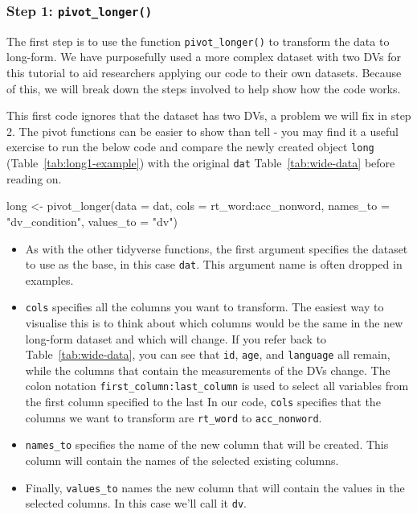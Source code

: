 \documentclass[
  english,
  doc,floatsintext]{apa6}
\newenvironment{Shaded}{\begin{snugshade}}{\end{snugshade}}
\newcommand{\AttributeTok}[1]{\textcolor[rgb]{0.77,0.63,0.00}{#1}}
\newcommand{\FunctionTok}[1]{\textcolor[rgb]{0.00,0.00,0.00}{#1}}
\newcommand{\NormalTok}[1]{#1}
\newcommand{\OtherTok}[1]{\textcolor[rgb]{0.56,0.35,0.01}{#1}}
\newcommand{\SpecialCharTok}[1]{\textcolor[rgb]{0.00,0.00,0.00}{#1}}
\newcommand{\StringTok}[1]{\textcolor[rgb]{0.31,0.60,0.02}{#1}}
\begin{document}
\hypertarget{step-1-pivot_longer}{%
\subsubsection{\texorpdfstring{Step 1: \texttt{pivot\_longer()}}{Step 1: pivot\_longer()}}\label{step-1-pivot_longer}}

The first step is to use the function \texttt{pivot\_longer()} to transform the data to long-form. We have purposefully used a more complex dataset with two DVs for this tutorial to aid researchers applying our code to their own datasets. Because of this, we will break down the steps involved to help show how the code works.

This first code ignores that the dataset has two DVs, a problem we will fix in step 2. The pivot functions can be easier to show than tell - you may find it a useful exercise to run the below code and compare the newly created object \texttt{long} (Table~\ref{tab:long1-example}) with the original \texttt{dat} Table~\ref{tab:wide-data} before reading on.

\begin{Shaded}
\begin{Highlighting}[]
\NormalTok{long }\OtherTok{\textless{}{-}} \FunctionTok{pivot\_longer}\NormalTok{(}\AttributeTok{data =}\NormalTok{ dat, }
                     \AttributeTok{cols =}\NormalTok{ rt\_word}\SpecialCharTok{:}\NormalTok{acc\_nonword, }
                     \AttributeTok{names\_to =} \StringTok{"dv\_condition"}\NormalTok{,}
                     \AttributeTok{values\_to =} \StringTok{"dv"}\NormalTok{)}
\end{Highlighting}
\end{Shaded}

\begin{itemize}
\item
  As with the other tidyverse functions, the first argument specifies the dataset to use as the base, in this case \texttt{dat}. This argument name is often dropped in examples.
\item
  \texttt{cols} specifies all the columns you want to transform. The easiest way to visualise this is to think about which columns would be the same in the new long-form dataset and which will change. If you refer back to Table~\ref{tab:wide-data}, you can see that \texttt{id}, \texttt{age}, and \texttt{language} all remain, while the columns that contain the measurements of the DVs change. The colon notation \texttt{first\_column:last\_column} is used to select all variables from the first column specified to the last In our code, \texttt{cols} specifies that the columns we want to transform are \texttt{rt\_word} to \texttt{acc\_nonword}.
\item
  \texttt{names\_to} specifies the name of the new column that will be created. This column will contain the names of the selected existing columns.
\item
  Finally, \texttt{values\_to} names the new column that will contain the values in the selected columns. In this case we'll call it \texttt{dv}.
\end{itemize}
\end{document}
